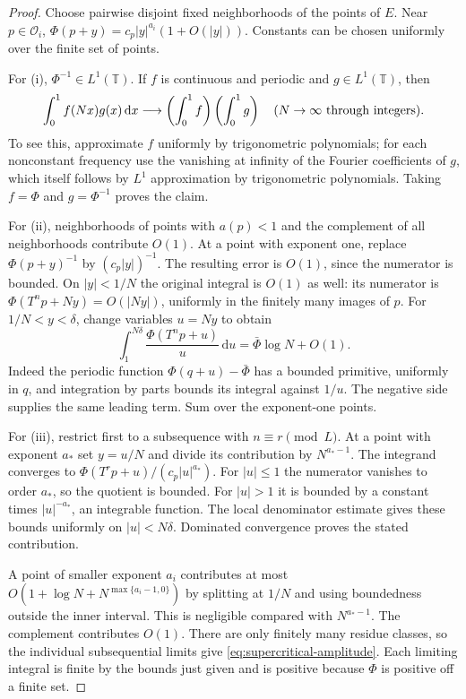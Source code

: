 \documentclass[11pt,a4paper]{article}
\numberwithin{equation}{section}
\theoremstyle{definition}
\theoremstyle{remark}
\newcommand{\TT}{\mathbb T}
\newcommand{\dd}{\,\mathrm d}
\newcommand{\cO}{\mathcal O}
\begin{document}
\begin{proof}
Choose pairwise disjoint fixed neighborhoods of the points of $E$.
Near $p\in\cO_i$,
$\Phi(p+y)=c_p|y|^{a_i}(1+O(|y|))$. Constants can be chosen uniformly
over the finite set of points.

For (i), $\Phi^{-1}\in L^1(\TT)$. If $f$ is continuous and periodic
and $g\in L^1(\TT)$, then
\[
 \int_0^1 f(Nx)g(x)\dd x\longrightarrow
       \left(\int_0^1f\right)\left(\int_0^1g\right)
       \quad(N\to\infty\hbox{ through integers}).
\]
To see this, approximate $f$ uniformly by trigonometric polynomials;
for each nonconstant frequency use the vanishing at infinity of the
Fourier coefficients of $g$, which itself follows by $L^1$
approximation by trigonometric polynomials. Taking $f=\Phi$ and
$g=\Phi^{-1}$ proves the claim.

For (ii), neighborhoods of points with $a(p)<1$ and the complement of
all neighborhoods contribute $O(1)$. At a point with exponent one,
replace $\Phi(p+y)^{-1}$ by $(c_p|y|)^{-1}$. The resulting error is
$O(1)$, since the numerator is bounded. On $|y|<1/N$ the original
integral is $O(1)$ as well: its numerator is
$\Phi(T^np+Ny)=O(|Ny|)$, uniformly in the finitely many images of $p$.
For $1/N<y<\delta$, change variables $u=Ny$ to obtain
\[
 \int_1^{N\delta}\frac{\Phi(T^np+u)}u\dd u
          =\bar\Phi\log N+O(1).
\]
Indeed the periodic function $\Phi(q+u)-\bar\Phi$ has a bounded
primitive, uniformly in $q$, and integration by parts bounds its
integral against $1/u$. The negative side supplies the same leading
term. Sum over the exponent-one points.

For (iii), restrict first to a subsequence with $n\equiv r\pmod L$.
At a point with exponent $a_*$ set $y=u/N$ and divide its contribution
by $N^{a_*-1}$. The integrand converges to
$\Phi(T^rp+u)/(c_p|u|^{a_*})$. For $|u|\le1$ the numerator vanishes
to order $a_*$, so the quotient is bounded. For $|u|>1$ it is bounded
by a constant times $|u|^{-a_*}$, an integrable function. The local
denominator estimate gives these bounds uniformly on $|u|<N\delta$.
Dominated convergence proves the stated contribution.

A point of smaller exponent $a_i$ contributes at most
$O(1+\log N+N^{\max\{a_i-1,0\}})$ by splitting at $1/N$ and using
boundedness outside the inner interval. This is negligible compared
with $N^{a_*-1}$. The complement contributes $O(1)$. There are only
finitely many residue classes, so the individual subsequential limits
give \cref{eq:supercritical-amplitude}. Each limiting integral is
finite by the bounds just given and is positive because $\Phi$ is
positive off a finite set.
\end{proof}
\end{document}
